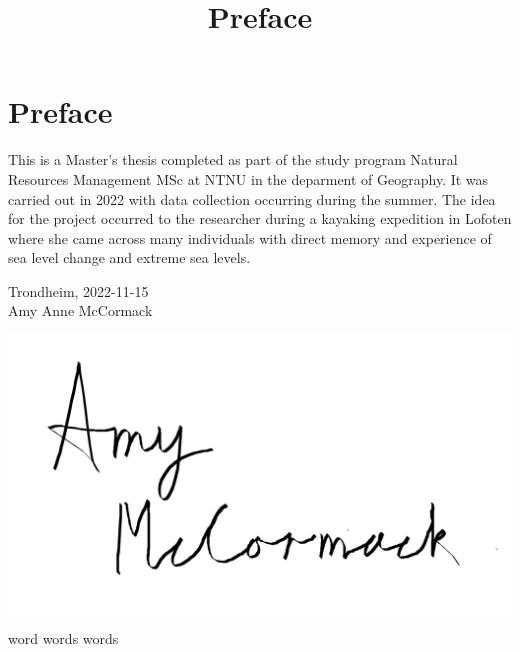 \documentclass{article}
\begin{document}

\section{Preface}


\title{Preface}
This is a Master's thesis completed as part of the study program Natural Resources Management MSc at NTNU in the deparment of Geography. It was carried out in 2022 with data collection occurring during the summer. The idea for the project occurred to the researcher during a kayaking expedition in Lofoten where she came across many individuals with direct memory and experience of sea level change and extreme sea levels. \\[2cm]

\begin{center}
Trondheim, 2022-11-15\\[1pc]


Amy Anne McCormack 
\end{center}



\graphicspath{ {./images/} }
\includegraphics[scale=0.5]{fig/to use signature png}
\newpage

\tableofcontents

\renewcommand{\listfigurename}{List of Figures}
\renewcommand{\listtablename}{List of Tables}

\listoffigures
\listoftables
\clearpage
{}



word words words
\end{document}
